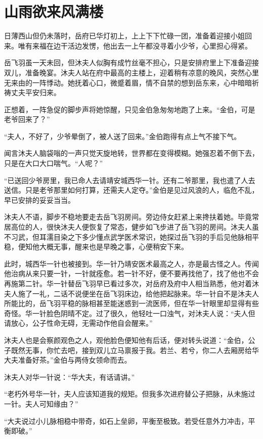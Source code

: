 
\chapter{山雨欲来风满楼}
\label{chap:shan-yu-yu-lai-feng-man-lou}

日薄西山但仍未落时，岳府已华灯初上，上上下下忙碌一团，准备着迎接小姐回来。唯有来福在边干活边发愣，他出去一上午都没寻着小少爷，心里担心得紧。

岳飞羽虽一天未回，但沐夫人似胸有成竹丝毫不担心，只是安排府里上下准备迎接双儿，准备晚宴。沐夫人站在府中最高的主楼上，迎着稍有凉意的晚风，突然心里无来由的一阵悸动。她抚着心口，微蹙着眉，情不自禁的想到岳东来，心中暗暗祈祷丈夫平安归来。

正想着，一阵急促的脚步声将她惊醒，只见金伯急匆匆地跑了上来。“金伯，可是老爷回来了？”

“夫人，不好了，少爷晕倒了，被人送了回来。”金伯跑得有点上气不接下气。

闻言沐夫人脑袋嗡的一声只觉天旋地转，世界都在变得模糊。她强忍着不倒下去，只是在大口大口喘气。“人呢？”

“已送回少爷房里，我已命人去请靖安城西华一针。还有二爷那里，我也遣了人去送信。只是老爷那里如何打算，还需夫人定夺。”金伯是见过风浪的人，临危不乱，早已安排的妥妥当当。

沐夫人不语，脚步不稳地要走去岳飞羽房间。旁边侍女赶紧上来搀扶着她。毕竟常居高位的人，很快沐夫人便恢复了常态，健步如飞步进了岳飞羽的房间。沐夫人虽不习武，但耳濡目染之下多少懂点武学医术常识，她探过岳飞羽的手后见他脉相平稳，便知他大概无事，醒来也是早晚之事，心便稍安下来。

此时，城西华一针也被接到。华一针乃靖安医术最高之人，亦是最古怪之人。传闻他治病从来只要一针，一针就痊愈。若一针不好，便不要再找他了，找了他也不会再施第二针。华一针替岳飞羽早已看过多次，对岳府及府中人相当熟悉，他对着沐夫人施了一礼，二话不说便坐在岳飞羽床边，给他把起脉来。华一针自不是沐夫人所能比的，岳飞羽平稳的脉相甚至能迷惑到一流医师，但在华一针眼里却显得有些奇怪。华一针脸色阴晴不定。过了很久，他轻吐一口浊气，对沐夫人说：“夫人但请放心，公子性命无碍，无需动作他自会醒来。”

沐夫人也是会察颜观色之人，观他脸色便知他有后话，便对转头说道：“金伯，公子既然无事，你忙去吧，接到双儿立马禀报于我。若兰、若兮，你二人去厢房给华大夫准备好茶。”金伯与两侍女领命而去。

沐夫人对华一针说：“华大夫，有话请讲。”

“老朽外号华一针，夫人应该知道我的规矩。但我多次进府替公子把脉，从未施过一针。夫人可知缘由？”

“大夫说过小儿脉相稳中带奇，如石上垒卵，平衡至极致。若受任意外力冲击，平衡即破。”

